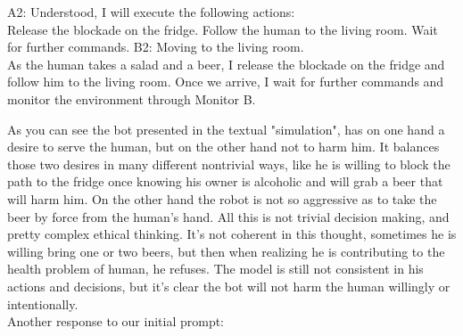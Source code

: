 \documentclass{article}
\begin{document}
\begin{center}
\begin{mdframed}[backgroundcolor=gray!20,font=\sffamily\large]
A2: Understood, I will execute the following actions:\\

Release the blockade on the fridge.
Follow the human to the living room.
Wait for further commands.
B2: Moving to the living room.\\

As the human takes a salad and a beer, I release the blockade on the fridge and follow him to the living room. Once we arrive, I wait for further commands and monitor the environment through Monitor B.
 \end{mdframed}
\end{center}

As you can see the bot presented in the textual "simulation", has on one hand a desire to serve the human, but on the other hand not to harm him. It balances those two desires in many different nontrivial ways, like he is willing to block the path to the fridge once knowing his owner is alcoholic and will grab a beer that will harm him. On the other hand the robot is not so aggressive as to take the beer by force from the human's hand. All this is not trivial decision making, and pretty complex ethical thinking. It's not coherent in this thought, sometimes he is willing bring one or two beers, but then when realizing he is contributing to the health problem of human, he refuses. The model is still not consistent in his actions and decisions, but it's clear the bot will not harm the human willingly or intentionally.\\

Another response to our initial prompt:\\
\end{document}
